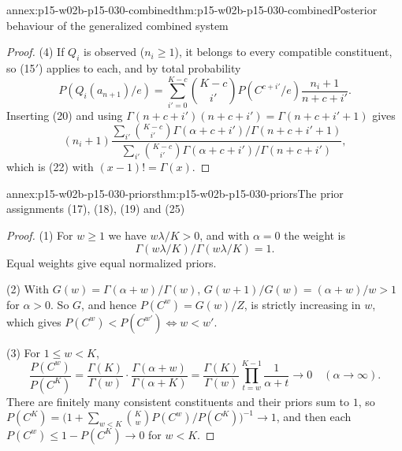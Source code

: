 \begin{annexitem}{annex:p15-w02b-p15-030-combined}{thm:p15-w02b-p15-030-combined}{Posterior behaviour of the generalized combined system}
\begin{proof}
(4) If \(Q_i\) is observed (\(n_i\geq1\)), it belongs to every compatible
constituent, so (15\('\)) applies to each, and by total probability
\[
 P(Q_i(a_{n+1})/e)=\sum_{i'=0}^{K-c}\binom{K-c}{i'}P(C^{c+i'}/e)\frac{n_i+1}{n+c+i'} .
\]
Inserting (20) and using \(\Gamma(n+c+i')(n+c+i')=\Gamma(n+c+i'+1)\) gives
\[
 (n_i+1)\frac{\sum_{i'}\binom{K-c}{i'}\Gamma(\alpha+c+i')/\Gamma(n+c+i'+1)}
 {\sum_{i'}\binom{K-c}{i'}\Gamma(\alpha+c+i')/\Gamma(n+c+i')},
\]
which is (22) with \((x-1)!=\Gamma(x)\).
\end{proof}
\end{annexitem}

\begin{annexitem}{annex:p15-w02b-p15-030-priors}{thm:p15-w02b-p15-030-priors}{The prior assignments (17), (18), (19) and (25)}
\begin{proof}
(1) For \(w\geq1\) we have \(w\lambda/K>0\), and with \(\alpha=0\) the
weight is
\[
 \Gamma(w\lambda/K)/\Gamma(w\lambda/K)=1 .
\]
Equal weights give equal normalized priors.

(2) With \(G(w)=\Gamma(\alpha+w)/\Gamma(w)\),
\(G(w+1)/G(w)=(\alpha+w)/w>1\) for \(\alpha>0\). So \(G\), and hence
\(P(C^w)=G(w)/Z\), is strictly increasing in \(w\), which gives
\(P(C^w)<P(C^{w'})\iff w<w'\).

(3) For \(1\leq w<K\),
\[
 \frac{P(C^w)}{P(C^K)}=\frac{\Gamma(K)}{\Gamma(w)}\cdot\frac{\Gamma(\alpha+w)}{\Gamma(\alpha+K)}
 =\frac{\Gamma(K)}{\Gamma(w)}\prod_{t=w}^{K-1}\frac1{\alpha+t}\longrightarrow0
 \quad(\alpha\to\infty).
\]
There are finitely many consistent constituents and their priors sum to
\(1\), so \(P(C^K)=\bigl(1+\sum_{w<K}\binom Kw P(C^w)/P(C^K)\bigr)^{-1}\to1\),
and then each \(P(C^w)\leq1-P(C^K)\to0\) for \(w<K\).
\end{proof}
\end{annexitem}

